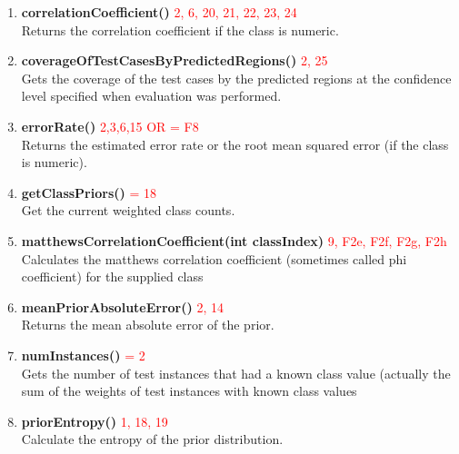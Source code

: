 \documentclass[a4paper,12pt]{article}
\begin{document}
\begin{enumerate}
          
\item \textbf{correlationCoefficient()} \textcolor{red}{2, 6, 20, 21, 22, 23, 24}
         \\ Returns the correlation coefficient if the class is numeric.
          
\item \textbf{coverageOfTestCasesByPredictedRegions()} \textcolor{red}{2, 25}
         \\ Gets the coverage of the test cases by the predicted regions at the confidence level specified when evaluation was performed.
          

          
\item \textbf{errorRate()} \textcolor{red}{2,3,6,15 OR = F8}
          \\Returns the estimated error rate or the root mean squared error (if the class is numeric).

                    

\item \textbf{getClassPriors()} \textcolor{red}{ = 18}
      \\    Get the current weighted class counts.
                       


          
\item \textbf{matthewsCorrelationCoefficient(int classIndex)} \textcolor{red}{9, F2e, F2f, F2g, F2h}
      \\    Calculates the matthews correlation coefficient (sometimes called phi coefficient) for the supplied class
          

          
\item \textbf{meanPriorAbsoluteError()} \textcolor{red}{2, 14}
       \\   Returns the mean absolute error of the prior.
          


\item \textbf{numInstances()} \textcolor{red}{ = 2}
        \\  Gets the number of test instances that had a known class value (actually the sum of the weights of test instances with known class values
            
\item \textbf{priorEntropy()} \textcolor{red}{1, 18, 19}
         \\ Calculate the entropy of the prior distribution.    
                    

\end{enumerate}
\end{document}
